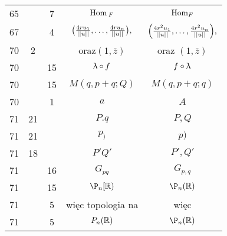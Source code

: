 \documentclass[a4paper,11pt]{article}
\begin{document}
\begin{center}
\begin{tabular}{|c|c|c|c|c|}
    65  & &  7 & $\textrm{Hom}_{ \: F }$ & $\textrm{Hom}_{ F }$ \\
    67  & &  4 & $\big( \frac{ 4 r u_{ 1 } }{ \left|\left|  u  \right|\right| }, \ldots,
                 \frac{ 4 r u_{ n } }{ \left|\left|  u  \right|\right| } \big),$
           & $\left( \frac{ 4 r^{ 2 } u_{ 1 } }{ \left|\left|  u  \right|\right| }, \ldots,
             \frac{ 4 r^{ 2 } u_{ n } }{ \left|\left|  u  \right|\right| } \right)\! ,$ \\
    70  &  2 & & oraz$( 1, \bar{ z } )$ & oraz $( 1, \bar{ z } )$ \\
    70  & & 15 & $\uplambda \circ f$ & $f \circ \uplambda$ \\
    70  & & 15 & $M( q, p + q; Q)$ & $M( q, p + q; q)$ \\
    70  & &  1 & $a$ & $A$ \\
    71  & 21 & & $P.q$ & $P, Q$ \\
    71  & 21 & & $p_{ ) }$ & $p )$ \\
    71  & 18 & & $P' Q'$ & $P', Q'$ \\
    71  & & 16 & $G_{ pq }$ & $G_{ p, q }$ \\
    71  & & 15 & $\P_{ n }[ \R )$ & $\P_{ n }( \R )$ \\
    71  & &  5 & więc topologia na & więc \\
    71  & &  5 & $P_{ n }( \mathbb{R} )$ & $\P_{ n }( \R )$ \\ 
    \hline
  \end{tabular}


\end{center}
\end{document}
